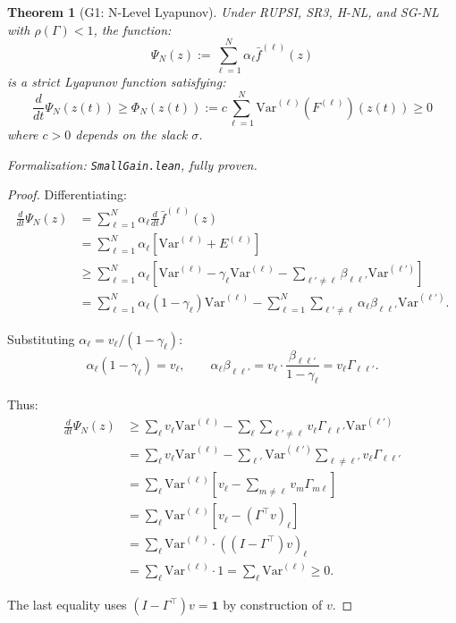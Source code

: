 \documentclass[12pt]{article}
\newtheorem{theorem}{Theorem}[section]
\newcommand{\Var}{\mathrm{Var}}
\begin{document}
\begin{theorem}[G1: N-Level Lyapunov]
\label{thm:g1}
Under RUPSI, SR3, H-NL, and SG-NL with $\rho(\Gamma) < 1$, the function:
\[
\Psi_N(z) := \sum_{\ell=1}^N \alpha_\ell \bar{f}^{(\ell)}(z)
\]
is a strict Lyapunov function satisfying:
\[
\frac{d}{dt} \Psi_N(z(t)) \geq \Phi_N(z(t)) := c \sum_{\ell=1}^N \Var^{(\ell)}(F^{(\ell)})(z(t)) \geq 0
\]
where $c > 0$ depends on the slack $\sigma$.
\end{theorem}
\noindent\textit{Formalization: \texttt{SmallGain.lean}, fully proven.}

\begin{proof}
Differentiating:
\begin{align*}
\frac{d}{dt} \Psi_N(z) &= \sum_{\ell=1}^N \alpha_\ell \frac{d}{dt} \bar{f}^{(\ell)}(z) \\
&= \sum_{\ell=1}^N \alpha_\ell \left[ \Var^{(\ell)} + E^{(\ell)} \right] \\
&\geq \sum_{\ell=1}^N \alpha_\ell \left[ \Var^{(\ell)} - \gamma_\ell \Var^{(\ell)} - \sum_{\ell' \neq \ell} \beta_{\ell\ell'} \Var^{(\ell')} \right] \\
&= \sum_{\ell=1}^N \alpha_\ell (1 - \gamma_\ell) \Var^{(\ell)} - \sum_{\ell=1}^N \sum_{\ell' \neq \ell} \alpha_\ell \beta_{\ell\ell'} \Var^{(\ell')}.
\end{align*}

Substituting $\alpha_\ell = v_\ell / (1 - \gamma_\ell)$:
\[
\alpha_\ell (1 - \gamma_\ell) = v_\ell, \qquad \alpha_\ell \beta_{\ell\ell'} = v_\ell \cdot \frac{\beta_{\ell\ell'}}{1 - \gamma_\ell} = v_\ell \Gamma_{\ell\ell'}.
\]

Thus:
\begin{align*}
\frac{d}{dt} \Psi_N(z) &\geq \sum_{\ell} v_\ell \Var^{(\ell)} - \sum_{\ell} \sum_{\ell' \neq \ell} v_\ell \Gamma_{\ell\ell'} \Var^{(\ell')} \\
&= \sum_{\ell} v_\ell \Var^{(\ell)} - \sum_{\ell'} \Var^{(\ell')} \sum_{\ell \neq \ell'} v_\ell \Gamma_{\ell\ell'} \\
&= \sum_{\ell} \Var^{(\ell)} \left[ v_\ell - \sum_{m \neq \ell} v_m \Gamma_{m\ell} \right] \\
&= \sum_{\ell} \Var^{(\ell)} \left[ v_\ell - (\Gamma^\top v)_\ell \right] \\
&= \sum_{\ell} \Var^{(\ell)} \cdot ((I - \Gamma^\top) v)_\ell \\
&= \sum_{\ell} \Var^{(\ell)} \cdot 1 = \sum_{\ell} \Var^{(\ell)} \geq 0.
\end{align*}

The last equality uses $(I - \Gamma^\top) v = \mathbf{1}$ by construction of $v$.
\end{proof}
\end{document}
